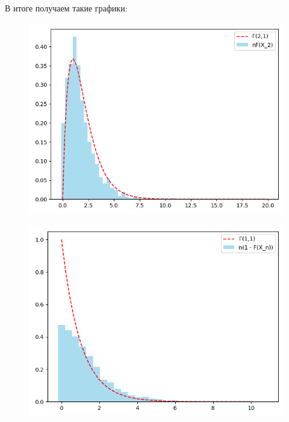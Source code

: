\documentclass{article}
\begin{document}
В итоге получаем такие графики:

\begin{figure}[H]
      \centering
      \includegraphics[width=0.5\linewidth]{Python/second-two-one.png}
\end{figure}
\begin{figure}[H]
      \centering
      \includegraphics[width=0.5\linewidth]{Python/second-one-one.png}
\end{figure}
\end{document}
